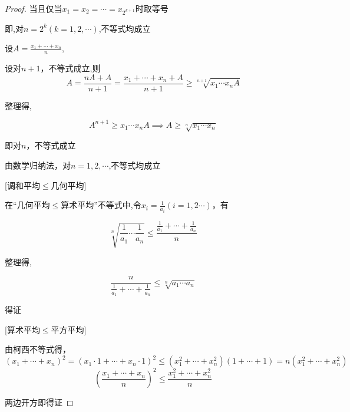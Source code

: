 \begin{proof}
    当且仅当$x_1=x_2=\cdots = x_{2^{k+1}}$时取等号

    \vspace{8pt}

    即,对$n=2^k(k=1,2,\cdots)$,不等式均成立

    \vspace{8pt}
    设$A=\frac{x_1+\cdots+x_n}{n}$,

    设对$n+1$，不等式成立,则
    \begin{equation}
        A=\frac{nA+A}{n+1}=\frac{x_1+\cdots+x_n+A}{n+1}\ge \sqrt[n+1]{x_1\cdots x_n A}
    \end{equation}

    整理得,

    \begin{equation}
        A^{n+1}\ge x_1\cdots x_n A \implies A\ge \sqrt[n]{x_1 \cdots x_n}
    \end{equation}

    即对$n$，不等式成立

    由数学归纳法，对$n=1,2,\cdots$,不等式均成立

    \vspace{8pt}

    [调和平均$\le$几何平均]

    \vspace{4pt}
    在“几何平均$\le$算术平均”不等式中,令$x_i=\frac{1}{a_i}(i=1,2\cdots)$，有

    \begin{equation}
        \sqrt[n]{\frac{1}{a_1}\cdots \frac{1}{a_n}} \le \frac{\frac{1}{a_1}+\cdots+\frac{1}{a_n}}{n}
    \end{equation}

    整理得,

    \begin{equation}
        \frac{n}{\frac{1}{a_1}+\cdots+\frac{1}{a_n}}\le \sqrt[n]{a_1\cdots a_n}
    \end{equation}

    得证

    \vspace{8pt}
    [算术平均$\le$平方平均]

    由柯西不等式得，
    \begin{equation*}
        (x_1+\cdots+x_n)^2=(x_1\cdot1 +\cdots +x_n\cdot1)^2\le (x_1^2+\cdots+x_n^2)(1+\cdots+1)=n(x_1^2+\cdots+x_n^2)
    \end{equation*}
    \begin{equation}
        (\frac{x_1+\cdots+x_n}{n})^2 \le \frac{x_1^2+\cdots +x_n^2}{n}
    \end{equation}

    两边开方即得证
\end{proof}

